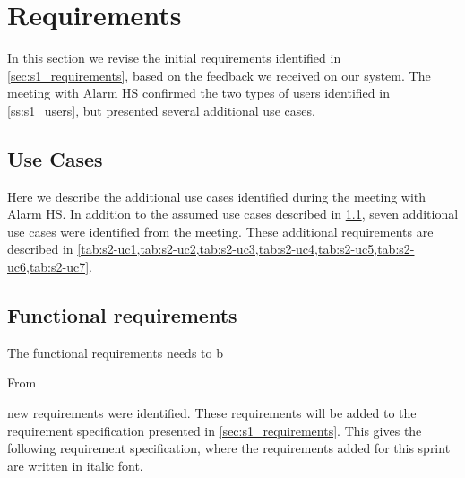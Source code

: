 \section{Requirements} \label{sec:s2_reqs}
In this section we revise the initial requirements identified in \cref{sec:s1_requirements}, based on the feedback we received on our system. The meeting with Alarm HS confirmed the two types of users identified in \cref{ss:s1_users}, but presented several additional use cases.

\subsection{Use Cases} \label{ss:s1_uc}
Here we describe the additional use cases identified during the meeting with Alarm HS. In addition to the assumed use cases described in \cref{ss:s1_uc}, seven additional use cases were identified from the meeting. These additional requirements are described in \cref{tab:s2-uc1,tab:s2-uc2,tab:s2-uc3,tab:s2-uc4,tab:s2-uc5,tab:s2-uc6,tab:s2-uc7}.




\subsection{Functional requirements}
The functional requirements needs to b

From

new requirements were identified. These requirements will be added to the requirement specification presented in \cref{sec:s1_requirements}. This gives the following requirement specification, where the requirements added for this sprint are written in italic font.

